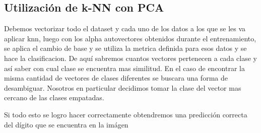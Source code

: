 
\subsection{Utilización de k-NN con PCA}

Debemos vectorizar todo el dataset y cada uno de los
datos a los que se les va aplicar knn, luego con los alpha autovectores
obtenidos durante el entrenamiento, se aplica el cambio de base y se utiliza la
metrica definida para esos datos y se hace la clasificacion. De aquí sabremos cuantos vectores pertenecen a cada clase y así saber con cual clase se encuentra mas similitud. En el caso de encontrar la misma cantidad de vectores de clases diferentes se buscara una forma de desambiguar. Nosotros en particular decidimos tomar la clase del vector mas cercano de las clases empatadas.

Si todo esto se logro hacer correctamente obtendremos una predicción correcta
del dígito que se encuentra en la imágen